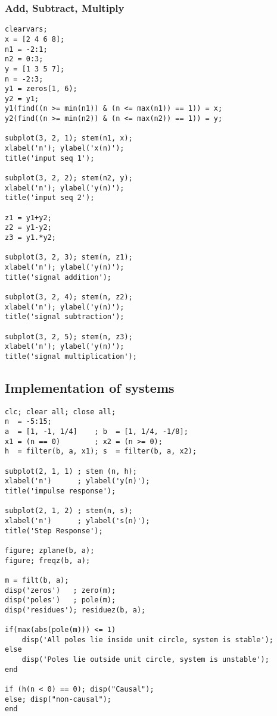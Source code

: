 \documentclass[12pt]{article}
\newcommand{\sectionc}[1]{\pagebreak {\centering \section{#1}} \vspace*{1cm}}
\begin{document}
\subsubsection{Add, Subtract, Multiply}
\begin{verbatim}
clearvars;
x = [2 4 6 8];
n1 = -2:1;
n2 = 0:3;
y = [1 3 5 7];
n = -2:3;
y1 = zeros(1, 6);
y2 = y1;
y1(find((n >= min(n1)) & (n <= max(n1)) == 1)) = x;
y2(find((n >= min(n2)) & (n <= max(n2)) == 1)) = y;

subplot(3, 2, 1); stem(n1, x);
xlabel('n'); ylabel('x(n)');
title('input seq 1');

subplot(3, 2, 2); stem(n2, y);
xlabel('n'); ylabel('y(n)');
title('input seq 2');

z1 = y1+y2;
z2 = y1-y2;
z3 = y1.*y2;

subplot(3, 2, 3); stem(n, z1);
xlabel('n'); ylabel('y(n)');
title('signal addition');

subplot(3, 2, 4); stem(n, z2);
xlabel('n'); ylabel('y(n)');
title('signal subtraction');

subplot(3, 2, 5); stem(n, z3);
xlabel('n'); ylabel('y(n)');
title('signal multiplication');
\end{verbatim}

\sectionc{Systems}
\subsection{Implementation of systems}
\begin{verbatim}
clc; clear all; close all;
n  = -5:15;
a  = [1, -1, 1/4]    ; b  = [1, 1/4, -1/8];
x1 = (n == 0)        ; x2 = (n >= 0);
h  = filter(b, a, x1); s  = filter(b, a, x2);

subplot(2, 1, 1) ; stem (n, h);
xlabel('n')      ; ylabel('y(n)');
title('impulse response');

subplot(2, 1, 2) ; stem(n, s);
xlabel('n')      ; ylabel('s(n)');
title('Step Response');

figure; zplane(b, a);
figure; freqz(b, a);

m = filt(b, a);
disp('zeros')   ; zero(m);
disp('poles')   ; pole(m);
disp('residues'); residuez(b, a);

if(max(abs(pole(m))) <= 1)
    disp('All poles lie inside unit circle, system is stable');
else
    disp('Poles lie outside unit circle, system is unstable');
end

if (h(n < 0) == 0); disp("Causal");
else; disp("non-causal");
end
\end{verbatim}
\end{document}
